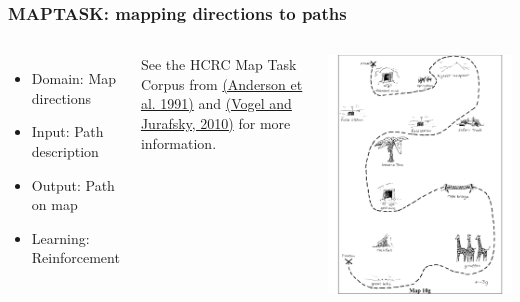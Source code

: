 \documentclass[ignorenonframetext]{beamer}
\begin{document}
\begin{frame}\frametitle{MAPTASK: mapping directions to paths}
\begin{columns}[c]
\begin{itemize}
\item Domain: Map directions
\item Input: Path description
\item Output: Path on map
\item Learning: Reinforcement
\end{itemize}

See the HCRC Map Task Corpus from
\href{http://groups.inf.ed.ac.uk/maptask}{(Anderson et al. 1991)} and
\href{http://nlp.stanford.edu/pubs/spatial-acl2010.pdf}{(Vogel and Jurafsky, 2010)} 
for more information.
\vspace*{5mm}


\href{http://groups.inf.ed.ac.uk/maptask}{
\includegraphics[width=\textwidth]{images/vogel-maptask.pdf}}


\end{columns}
\end{frame}
\end{document}
